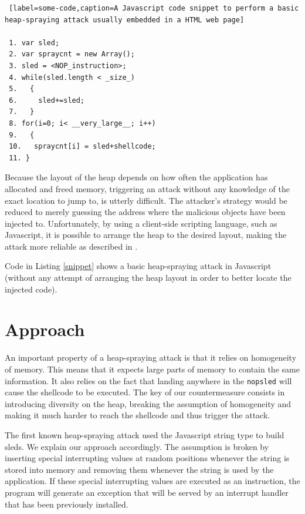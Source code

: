\begin{lstlisting} [label=some-code,caption=A Javascript code snippet to perform a basic heap-spraying attack usually embedded in a HTML web page]

 1. var sled;
 2. var spraycnt = new Array();
 3. sled = <NOP_instruction>; 
 4. while(sled.length < _size_)  
 5.   {
 6.     sled+=sled;
 7.   }
 8. for(i=0; i< __very_large__; i++)
 9.   {
 10.   spraycnt[i] = sled+shellcode;		
 11. }
\end{lstlisting}
 \label{snippet}

Because the layout of the heap depends on how often the application has allocated and freed memory, triggering an attack without any knowledge of the exact location to jump to, is utterly difficult. The attacker's strategy would be reduced to merely guessing the address where the malicious objects have been injected to.
Unfortunately, by using a client-side scripting language, such as Javascript, it is possible to arrange the heap to the desired layout, making the attack more reliable as described in \cite{heapfengshui, engheap}.

Code in Listing \ref{snippet} shows a basic heap-spraying attack in Javascript (without any attempt of arranging  the heap layout in order to better locate the injected code).


\section{Approach}\label{bub:approach}
An important property of a heap-spraying attack is that it relies on homogeneity of memory. This means that it expects large parts of memory to contain the same information. It also relies on the fact that landing anywhere in the \texttt{nopsled} will cause the shellcode to be executed. 
The key of our countermeasure consists in introducing diversity on the heap, breaking the assumption of homogeneity and making it much harder to reach the shellcode and thus trigger the attack.
 
The first known heap-spraying attack used the Javascript string type to build sleds. We explain our approach accordingly. 
The assumption is broken by inserting special interrupting values at random positions whenever the string is stored into memory and removing them whenever the string is used by the application. If these special interrupting values are executed as an instruction, the program will generate an exception that will be served by an interrupt handler that has been previously installed.

